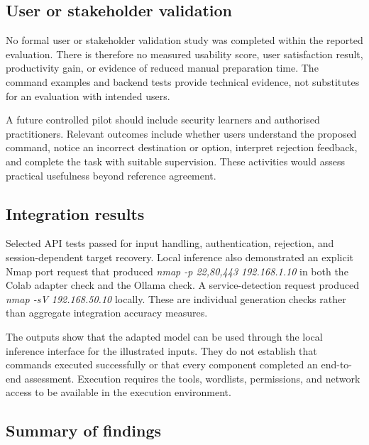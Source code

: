 \documentclass[
]{article}
\begin{document}
\hypertarget{user-or-stakeholder-validation}{%
\subsection{User or stakeholder
validation}\label{user-or-stakeholder-validation}}

No formal user or stakeholder validation study was completed within the
reported evaluation. There is therefore no measured usability score,
user satisfaction result, productivity gain, or evidence of reduced
manual preparation time. The command examples and backend tests provide
technical evidence, not substitutes for an evaluation with intended
users.

A future controlled pilot should include security learners and
authorised practitioners. Relevant outcomes include whether users
understand the proposed command, notice an incorrect destination or
option, interpret rejection feedback, and complete the task with
suitable supervision. These activities would assess practical usefulness
beyond reference agreement.

\hypertarget{integration-results}{%
\subsection{\texorpdfstring{ Integration
results}{ Integration results}}\label{integration-results}}

Selected API tests passed for input handling, authentication, rejection,
and session-dependent target recovery. Local inference also demonstrated
an explicit Nmap port request that produced \emph{nmap -p 22,80,443
192.168.1.10} in both the Colab adapter check and the Ollama check. A
service-detection request produced \emph{nmap -sV 192.168.50.10}
locally. These are individual generation checks rather than aggregate
integration accuracy measures.

The outputs show that the adapted model can be used through the local
inference interface for the illustrated inputs. They do not establish
that commands executed successfully or that every component completed an
end-to-end assessment. Execution requires the tools, wordlists,
permissions, and network access to be available in the execution
environment.

\hypertarget{summary-of-findings}{%
\subsection{\texorpdfstring{ Summary of
findings}{ Summary of findings}}\label{summary-of-findings}}
\end{document}
